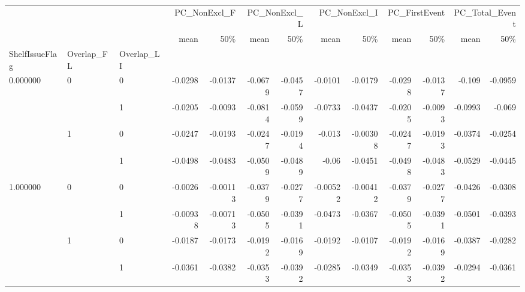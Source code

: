 \begin{tabular}{lllrrrrrrrrrr}
\toprule
 &  &  & \multicolumn{2}{r}{PC\_NonExcl\_F} & \multicolumn{2}{r}{PC\_NonExcl\_L} & \multicolumn{2}{r}{PC\_NonExcl\_I} & \multicolumn{2}{r}{PC\_FirstEvent} & \multicolumn{2}{r}{PC\_Total\_Event} \\
 &  &  & mean & 50\% & mean & 50\% & mean & 50\% & mean & 50\% & mean & 50\% \\
ShelfIssueFlag & Overlap_FL & Overlap_LI &  &  &  &  &  &  &  &  &  &  \\
\midrule
\multirow[t]{4}{*}{0.000000} & \multirow[t]{2}{*}{0} & 0 & -0.0298 & -0.0137 & -0.0679 & -0.0457 & -0.0101 & -0.0179 & -0.0298 & -0.0137 & -0.109 & -0.0959 \\
 &  & 1 & -0.0205 & -0.0093 & -0.0814 & -0.0599 & -0.0733 & -0.0437 & -0.0205 & -0.0093 & -0.0993 & -0.069 \\
\cline{2-13}
 & \multirow[t]{2}{*}{1} & 0 & -0.0247 & -0.0193 & -0.0247 & -0.0194 & -0.013 & -0.00308 & -0.0247 & -0.0193 & -0.0374 & -0.0254 \\
 &  & 1 & -0.0498 & -0.0483 & -0.0509 & -0.0489 & -0.06 & -0.0451 & -0.0498 & -0.0483 & -0.0529 & -0.0445 \\
\cline{1-13} \cline{2-13}
\multirow[t]{4}{*}{1.000000} & \multirow[t]{2}{*}{0} & 0 & -0.0026 & -0.00113 & -0.0379 & -0.0277 & -0.00522 & -0.00412 & -0.0379 & -0.0277 & -0.0426 & -0.0308 \\
 &  & 1 & -0.00938 & -0.00713 & -0.0505 & -0.0391 & -0.0473 & -0.0367 & -0.0505 & -0.0391 & -0.0501 & -0.0393 \\
\cline{2-13}
 & \multirow[t]{2}{*}{1} & 0 & -0.0187 & -0.0173 & -0.0192 & -0.0169 & -0.0192 & -0.0107 & -0.0192 & -0.0169 & -0.0387 & -0.0282 \\
 &  & 1 & -0.0361 & -0.0382 & -0.0353 & -0.0392 & -0.0285 & -0.0349 & -0.0353 & -0.0392 & -0.0294 & -0.0361 \\
\cline{1-13} \cline{2-13}
\bottomrule
\end{tabular}
